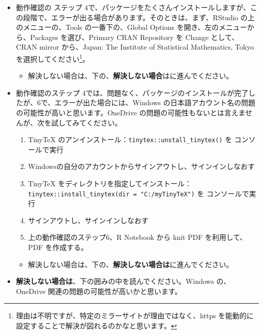 \documentclass[
  xelatex, ja=standard]{bxjsbook}
\providecommand{\tightlist}{%
  \setlength{\itemsep}{0pt}\setlength{\parskip}{0pt}}
\theoremstyle{definition}
\theoremstyle{definition}
\theoremstyle{definition}
\theoremstyle{definition}
\theoremstyle{remark}
\begin{document}
\begin{itemize}
\item
  動作確認の ステップ 4で、パッケージをたくさんインストールしますが、この段階で、エラーが出る場合があります。そのときは、まず、RStudio の上のメニューの、Tools の一番下の、Global Options を開き、左のメニューから、Packages を選び、Primary CRAN Repository を Change として、CRAN mirror から、Japan: The Institute of Statistical Mathematics, Tokyo を選択してください\footnote{理由は不明ですが、特定のミラーサイトが理由ではなく、https を能動的に設定することで解決が図れるのかなと思います。}。

  \begin{itemize}
  \tightlist
  \item
    解決しない場合は、下の、\textbf{解決しない場合}はに進んでください。
  \end{itemize}
\item
  動作確認のステップ 4では、問題なく、パッケージのインストールが完了したが、6で、エラーが出た場合には、Windows の日本語アカウント名の問題の可能性が高いと思います。OneDrive の問題の可能性もないとは言えませんが、次を試してみてください。

  \begin{enumerate}
  \def\labelenumi{\arabic{enumi}.}
  \tightlist
  \item
    TinyTeX のアンインストール：\texttt{tinytex::unstall\_tinytex()} を コンソールで実行
  \item
    Windowsの自分のアカウントからサインアウトし、サインインしなおす
  \item
    TinyTeX をディレクトリを指定してインストール：\texttt{tinytex::install\_tinytex(dir\ =\ "C:/myTinyTeX")} を コンソールで実行
  \item
    サインアウトし、サインインしなおす
  \item
    上の動作確認のステップ6、R Notebook から knit PDF を利用して、PDF を作成する。
  \end{enumerate}

  \begin{itemize}
  \tightlist
  \item
    解決しない場合は、下の、\textbf{解決しない場合は}に進んでください。
  \end{itemize}
\item
  \textbf{解決しない場合は}、下の囲みの中を読んでください。Windows の、OneDrive 関連の問題の可能性が高いかと思います。


\end{itemize}
\end{document}
